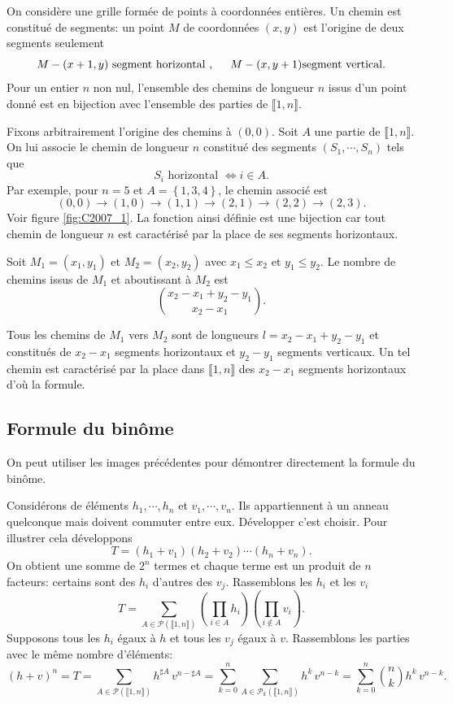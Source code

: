 On considère une grille formée de points à coordonnées entières. Un chemin est constitué de segments: un point $M$ de coordonnées $(x,y)$ est l'origine de deux segments seulement
\[
 M-(x+1,y) \text{ segment horizontal }, \hspace{0.5cm} M-(x,y+1) \text{segment vertical}. 
\]
Pour un entier $n$ non nul, l'ensemble des chemins de longueur $n$ issus d'un point donné est en bijection avec l'ensemble des parties de $\llbracket 1,n\rrbracket$.
\begin{demo}
 Fixons arbitrairement l'origine des chemins à $(0,0)$. Soit $A$ une partie de $\llbracket 1,n \rrbracket$. On lui associe le chemin de longueur $n$ constitué des segments $(S_1,\cdots, S_n)$ tels que 
 \[
  S_i \text{ horizontal } \Leftrightarrow i \in A. 
 \]
Par exemple, pour $n=5$ et $A = \left\lbrace 1,3,4 \right\rbrace$, le chemin associé est
\[
 (0,0) \rightarrow (1,0)\rightarrow (1,1) \rightarrow (2,1) \rightarrow (2,2) \rightarrow (2,3).
\]
Voir figure \ref{fig:C2007_1}. La fonction ainsi définie est une bijection car tout chemin de longueur $n$ est caractérisé par la place de ses segments horizontaux.
\end{demo}
Soit $M_1 = (x_1,y_1)$ et $M_2 = (x_2,y_2)$ avec $x_1 \leq x_2$ et $y_1 \leq y_2$. Le nombre de chemins issus de $M_1$ et aboutissant à $M_2$ est 
\[
\binom{x_2 - x_1 + y_2 - y_1}{x_2 - x_1}. 
\]
\begin{demo}
 Tous les chemins de $M_1$ vers $M_2$ sont de longueurs $l = x_2 - x_1 + y_2 - y_1$ et constitués de $x_2 - x_1$ segments horizontaux et $y_2 - y_1$ segments verticaux. Un tel chemin est caractérisé par la place dans $\llbracket 1,n \rrbracket$ des $x_2-x_1$ segments horizontaux d'où la formule.
\end{demo}

\subsection{Formule du binôme}
On peut utiliser les images précédentes pour démontrer directement la formule du binôme. 
\begin{demo}
Considérons de éléments $h_1,\cdots, h_n$ et $v_1,\cdots,v_n$. Ils appartiennent à un anneau quelconque mais doivent commuter entre eux.\newline
Développer c'est choisir. Pour illustrer cela développons 
\[
 T = (h_1 + v_1)(h_2 + v_2) \cdots (h_n + v_n).
\]
On obtient une somme de $2^n$ termes et chaque terme est un produit de $n$ facteurs: certains sont des $h_i$ d'autres des $v_j$. Rassemblons les $h_i$ et les $v_i$
\[
 T = \sum_{A \in \mathcal{P}(\llbracket 1,n \rrbracket)} \left( \prod_{i\in A}h_i\right) \left( \prod_{i \notin A}v_i\right).
\]
Supposons tous les $h_i$ égaux à $h$ et tous les $v_j$ égaux à $v$. Rassemblons les parties avec le même nombre d'éléments:
\[
 (h + v)^n = T = \sum_{A \in \mathcal{P}(\llbracket 1,n \rrbracket)} h^{\sharp A}\, v^{n - \sharp A}
 = \sum_{k = 0}^{n}\sum_{A \in \mathcal{P}_k(\llbracket 1,n \rrbracket)} h^{k}\, v^{n - k}
 = \sum_{k = 0}^{n}\binom{n}{k} h^{k}\, v^{n - k}.
\] 
\end{demo}



